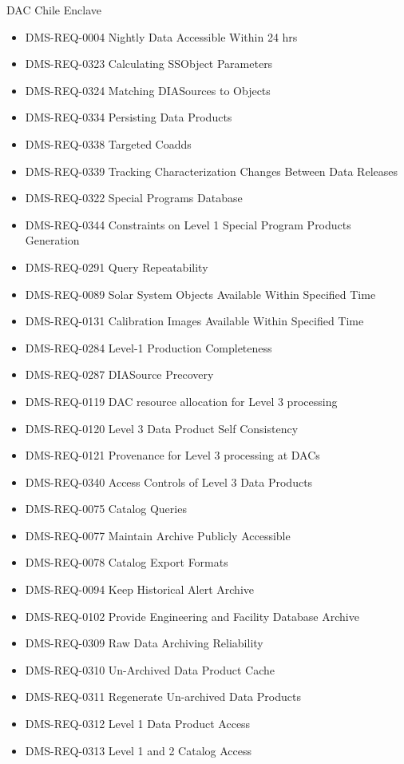 DAC Chile Enclave \begin{itemize}
\item DMS-REQ-0004 Nightly Data Accessible Within 24 hrs
\item DMS-REQ-0323 Calculating SSObject Parameters
\item DMS-REQ-0324 Matching DIASources to Objects
\item DMS-REQ-0334 Persisting Data Products
\item DMS-REQ-0338 Targeted Coadds
\item DMS-REQ-0339 Tracking Characterization Changes Between Data Releases
\item DMS-REQ-0322 Special Programs Database
\item DMS-REQ-0344 Constraints on Level 1 Special Program Products Generation
\item DMS-REQ-0291 Query Repeatability
\item DMS-REQ-0089 Solar System Objects Available Within Specified Time
\item DMS-REQ-0131 Calibration Images Available Within Specified Time
\item DMS-REQ-0284 Level-1 Production Completeness
\item DMS-REQ-0287 DIASource Precovery
\item DMS-REQ-0119 DAC resource allocation for Level 3 processing
\item DMS-REQ-0120 Level 3 Data Product Self Consistency
\item DMS-REQ-0121 Provenance for Level 3 processing at DACs
\item DMS-REQ-0340 Access Controls of Level 3 Data Products
\item DMS-REQ-0075 Catalog Queries
\item DMS-REQ-0077 Maintain Archive Publicly Accessible
\item DMS-REQ-0078 Catalog Export Formats
\item DMS-REQ-0094 Keep Historical Alert Archive
\item DMS-REQ-0102 Provide Engineering and Facility Database Archive
\item DMS-REQ-0309 Raw Data Archiving Reliability
\item DMS-REQ-0310 Un-Archived Data Product Cache
\item DMS-REQ-0311 Regenerate Un-archived Data Products
\item DMS-REQ-0312 Level 1 Data Product Access
\item DMS-REQ-0313 Level 1 and 2 Catalog Access

\end{itemize}
